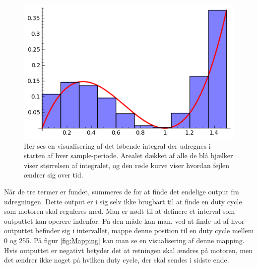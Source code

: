 \begin{figure}[ht]
	\begin{center}
	\includegraphics[scale=0.8]{Billeder/RiemannSum.png}
	\end{center}		
	\caption{Her ses en visualisering af det løbende integral der udregnes i starten af hver sample-periode. Arealet dækket af alle de blå bjælker viser størrelsen af integralet, og den røde kurve viser hvordan fejlen ændrer sig over tid.}
	\label{fig:Riemann}
\end{figure}

Når de tre termer er fundet, summeres de for at finde det endelige output fra udregningen. Dette output er i sig selv ikke brugbart til at finde en duty cycle som motoren skal reguleres med. Man er nødt til at definere et interval som outputtet kan operere indenfor. På den måde kan man, ved at finde ud af hvor outputtet befinder sig i intervallet, mappe denne position til en duty cycle mellem 0 og 255. På figur \ref{fig:Mapping} kan man se en visualisering af denne mapping. Hvis outputtet er negativt betyder det at retningen skal ændres på motoren, men det ændrer ikke noget på hvilken duty cycle, der skal sendes i sidste ende.

